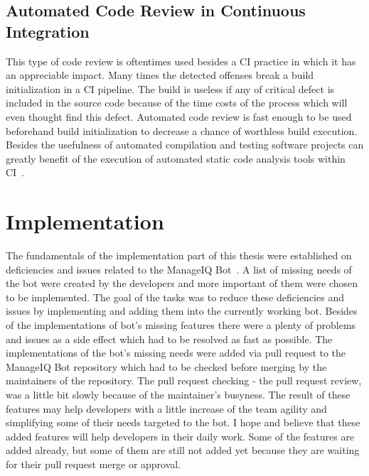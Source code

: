 \section{Automated Code Review in Continuous Integration}

This type of code review is oftentimes used besides a CI practice in which it has an appreciable impact. Many times the detected offenses break a build initialization in a CI pipeline. The build is useless if any of critical defect is included in the source code because of the time costs of the process which will even thought find this defect. Automated code review is fast enough to be used beforehand build initialization to decrease a chance of worthless build execution. Besides the usefulness of automated compilation and testing software projects can greatly benefit of the execution of automated static code analysis tools within CI~\cite{SCA_in_CI}.\\

\chapter{Implementation}\label{chapter:implementation}

The fundamentals of the implementation part of this thesis were established on deficiencies and issues related to the ManageIQ Bot~\cite{MIQBOT}. A list of missing needs of the bot were created by the developers and more important of them were chosen to be implemented. The goal of the tasks was to reduce these deficiencies and issues by implementing and adding them into the currently working bot. Besides of the implementations of bot's missing features there were a plenty of problems and issues as a side effect which had to be resolved as fast as possible. The implementations of the bot's missing needs were added via pull request to the ManageIQ Bot repository which had to be checked before merging by the maintainers of the repository. The pull request checking - the pull request review, was a little bit slowly because of the maintainer's busyness. The result of these features may help developers with a little increase of the team agility and simplifying some of their needs targeted to the bot. I hope and believe that these added features will help developers in their daily work. Some of the features are added already, but some of them are still not added yet because they are waiting for their pull request merge or approval.

